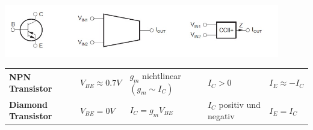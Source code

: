 \begin{center}
	\includegraphics[width=12cm]{images/op_diamond}
\end{center}

\begin{tabular}{lllll}
	\textbf{NPN Transistor} & $V_{BE} \approx 0.7V$ & 
		$g_m$ nichtlinear $(g_m \sim I_C)$ & $I_C > 0$ & $I_E \approx-I_C$ \\
	\textbf{Diamond Transistor} & $V_{BE} = 0V$ & $I_C = g_m V_{BE}$ &
		$I_C$ positiv und negativ & $I_E = I_C$ \\
\end{tabular}

